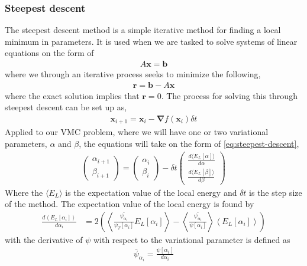 \documentclass[11pt]{article}
\newcommand{\expect}[1]{\left\langle{#1}\right\rangle}
\begin{document}
\subsubsection{Steepest descent}
The steepest descent method is a simple iterative method for finding a local minimum in parameters. It is used when we are tasked to solve systems of linear equations on the form of
\begin{align*}
	A \mathbf{x} = \mathbf{b}
\end{align*}
where we through an iterative process seeks to minimize the following,
\begin{align*}
	\mathbf{r} = \mathbf{b} - A \mathbf{x}
\end{align*}
where the exact solution implies that $\mathbf{r}=0$. The process for solving this through steepest descent can be set up as, 
\begin{align}
	\mathbf{x}_{i+1} = \mathbf{x}_i - \bm{\nabla} f(\mathbf{x}_i) \delta t
	\label{eq:steepest-descent}
\end{align}
Applied to our VMC problem, where we will have one or two variational parameters, $\alpha$ and $\beta$, the equations will take on the form of \eqref{eq:steepest-descent},
\begin{align}
	\begin{pmatrix}
		\alpha_{i+1} \\
		\beta_{i+1}
	\end{pmatrix}
	=
	\begin{pmatrix}
		\alpha_{i} \\
		\beta_{i}
	\end{pmatrix}
	- \delta t
	\begin{pmatrix}
		\frac{d\langle E_L[\alpha] \rangle}{d\alpha} \\
		\frac{d\langle E_L[\beta] \rangle}{d\beta}
	\end{pmatrix}
\end{align}
Where the $\langle E_L \rangle$ is the expectation value of the local energy and $\delta t$ is the step size of the method. The expectation value of the local energy is found by
\begin{align}
	\frac{d\expect{E_L[\alpha_i]}}{d\alpha_i} &= 2 \left( \expect{ \frac{\bar{\psi_{\alpha_i}}}{\psi_T[\alpha_i]}E_L[\alpha_i] } - \expect{\frac{\bar{\psi_{\alpha_i}}}{\psi[\alpha_i]}}\expect{E_L[\alpha_i]} \right)
	\label{eq:local-energy-variational-derivative}
\end{align}
with the derivative of $\psi$ with respect to the variational parameter is defined as
\begin{align*}
	\bar{\psi}_{\alpha_i} = \frac{\psi[\alpha_i]}{d\alpha_i}
\end{align*}
\end{document}
